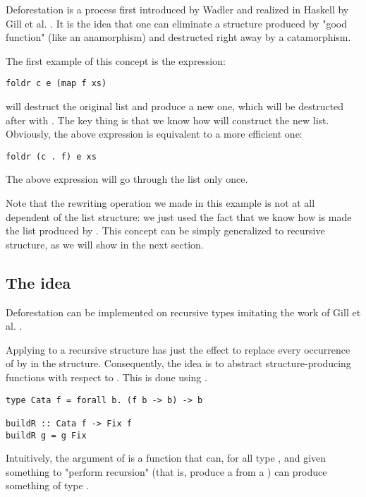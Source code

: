 
Deforestation is a process first introduced by Wadler \cite{WADLER1990231} and realized in Haskell by Gill et al. \cite{Gill:1993:SCD:165180.165214}. It is the idea that one can eliminate a structure produced by "good function" (like an anamorphism) and destructed right away by a catamorphism.

The first example of this concept is the expression:
\begin{verbatim}
foldr c e (map f xs)
\end{verbatim}
 will destruct the original list and produce a new one, which will be destructed after with . The key thing is that we know how  will construct the new list. Obviously, the above expression is equivalent to a more efficient one:
\begin{verbatim}
foldr (c . f) e xs
\end{verbatim}
The above expression will go through the list only once.

Note that the rewriting operation we made in this example is not at all dependent of the list structure: we just used the fact that we know how is made the list produced by . This concept can be simply generalized to recursive structure, as we will show in the next section.


\subsection{The idea}
Deforestation can be implemented on recursive types imitating the work of Gill et al. \cite{Gill:1993:SCD:165180.165214}.

Applying  to a recursive structure has just the effect to replace every occurrence of  by  in the structure. Consequently, the idea is to abstract structure-producing functions with respect to . This is done using .

\begin{verbatim}
type Cata f = forall b. (f b -> b) -> b

buildR :: Cata f -> Fix f
buildR g = g Fix
\end{verbatim}

Intuitively, the argument of  is a function that can, for all type , and given something to "perform recursion" (that is, produce a  from a ) can produce something of type .

